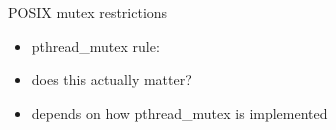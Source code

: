 \begin{frame}{POSIX mutex restrictions}
\begin{itemize}
\item pthread\_mutex rule: 
\vspace{.5cm}
\item does this actually matter?
\item depends on how pthread\_mutex is implemented
\end{itemize}
\end{frame}
